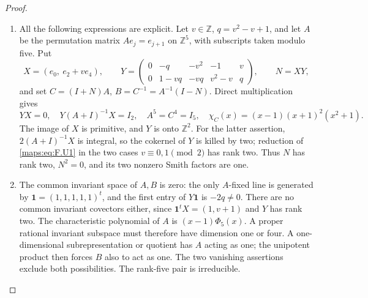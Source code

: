 \documentclass[11pt,a4paper]{article}
\theoremstyle{definition}
\begin{document}
\begin{proof}
\begin{enumerate}[label=\arabic*.]
\item All the following expressions are explicit.  Let $v\in\mathbb Z$,
$q=v^2-v+1$, and let $A$ be the permutation matrix
$Ae_j=e_{j+1}$ on $\mathbb Z^5$, with subscripts taken modulo five.
Put
\[
 X=(e_0,\ e_2+ve_4),\qquad
 Y=\begin{pmatrix}
 0&-q&-v^2&-1&v\\
 0&1-vq&-vq&v^2-v&q
 \end{pmatrix},\qquad N=XY,
 \tag{F.U1}\label{maps:eq:F.U1}
\]
and set $C=(I+N)A$, $B=C^{-1}=A^{-1}(I-N)$.
Direct multiplication gives
\[
 YX=0,\quad Y(A+I)^{-1}X=I_2,\quad
 A^5=C^4=I_5,\quad
 \chi_C(x)=(x-1)(x+1)^2(x^2+1).
 \tag{F.U2}\label{maps:eq:F.U2}
\]
The image of $X$ is primitive, and $Y$ is onto $\mathbb Z^2$.
For the latter assertion, $2(A+I)^{-1}X$ is integral, so the
cokernel of $Y$ is killed by two; reduction of \eqref{maps:eq:F.U1} in the
two cases $v\equiv0,1\pmod2$ has rank two.  Thus $N$ has
rank two, $N^2=0$, and its two nonzero Smith factors are one.

\item The common invariant space of $A,B$ is zero: the only
$A$-fixed line is generated by $\mathbf1=(1,1,1,1,1)^t$,
and the first entry of $Y\mathbf1$ is $-2q\ne0$.
There are no common invariant covectors either, since
$\mathbf1^tX=(1,v+1)$ and $Y$ has rank two.
The characteristic polynomial of $A$ is $(x-1)\Phi_5(x)$.
A proper rational invariant subspace must therefore have
dimension one or four.  A one-dimensional subrepresentation
or quotient has $A$ acting as one; the unipotent product then
forces $B$ also to act as one.  The two vanishing assertions
exclude both possibilities.  The rank-five pair is irreducible.


\end{enumerate}
\end{proof}
\end{document}
